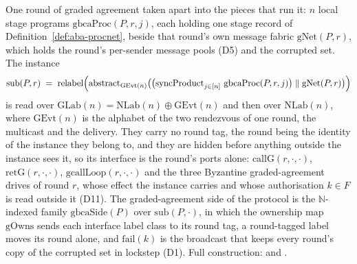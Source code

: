 \begin{definition}
  \label{def:aba-gbcasub}
  \leanok
  One round of graded agreement taken apart into the pieces that run it: $n$ local stage programs $\mathrm{gbcaProc}(P,r,j)$, each holding one stage record of Definition~\ref{def:aba-procnet}, beside that round's own message fabric $\mathrm{gNet}(P,r)$, which holds the round's per-sender message pools (D5) and the corrupted set.
  The instance
  \[
    \mathrm{sub}(P,r) \;=\; \mathrm{relabel}\Bigl(
      \mathrm{abstract}_{\mathrm{GEvt}(n)}\bigl(
        \bigl(\mathrm{syncProduct}_{j \in [n]}\ \mathrm{gbcaProc}(P,r,j)\bigr)
          \parallel \mathrm{gNet}(P,r)\bigr)\Bigr)
  \]
  is read over $\mathrm{GLab}(n) = \mathrm{NLab}(n) \oplus \mathrm{GEvt}(n)$ and then over $\mathrm{NLab}(n)$, where $\mathrm{GEvt}(n)$ is the alphabet of the two rendezvous of one round, the multicast and the delivery.
  They carry no round tag, the round being the identity of the instance they belong to, and they are hidden before anything outside the instance sees it, so its interface is the round's ports alone: $\mathrm{callG}(r,\cdot,\cdot)$, $\mathrm{retG}(r,\cdot,\cdot)$, $\mathrm{gcallLoop}(r,\cdot,\cdot)$ and the three Byzantine graded-agreement drives of round $r$, whose effect the instance carries and whose authorisation $k \in F$ is read outside it (D11).
  The graded-agreement side of the protocol is the $\mathbb{N}$-indexed family $\mathrm{gbcaSide}(P)$ over $\mathrm{sub}(P,\cdot)$, in which the ownership map $\mathrm{gOwns}$ sends each interface label class to its round tag, a round-tagged label moves its round alone, and $\mathrm{fail}(k)$ is the broadcast that keeps every round's copy of the corrupted set in lockstep (D1).
  Full construction:  and .
\end{definition}
